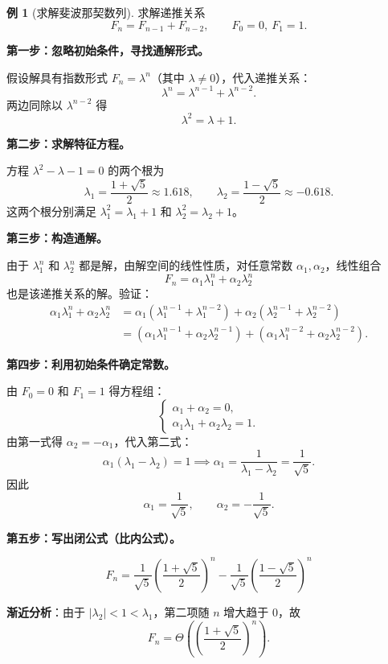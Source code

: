 \documentclass[UTF8,11pt,a4paper]{ctexbook}   %
\theoremstyle{definition}
\newtheorem{example}{例}[section]
\begin{document}
\begin{example}[求解斐波那契数列]
求解递推关系
\[
F_n = F_{n-1} + F_{n-2},\qquad F_0 = 0,\ F_1 = 1.
\]

\textbf{第一步：忽略初始条件，寻找通解形式。}

假设解具有指数形式 $F_n = \lambda^n$（其中 $\lambda \neq 0$），代入递推关系：
\[
\lambda^n = \lambda^{n-1} + \lambda^{n-2}.
\]
两边同除以 $\lambda^{n-2}$ 得
\[
\lambda^2 = \lambda + 1.
\]

\textbf{第二步：求解特征方程。}

方程 $\lambda^2 - \lambda - 1 = 0$ 的两个根为
\[
\lambda_1 = \frac{1+\sqrt{5}}{2} \approx 1.618,\qquad \lambda_2 = \frac{1-\sqrt{5}}{2} \approx -0.618.
\]
这两个根分别满足 $\lambda_1^2 = \lambda_1 + 1$ 和 $\lambda_2^2 = \lambda_2 + 1$。

\textbf{第三步：构造通解。}

由于 $\lambda_1^n$ 和 $\lambda_2^n$ 都是解，由解空间的线性性质，对任意常数 $\alpha_1, \alpha_2$，线性组合
\[
F_n = \alpha_1 \lambda_1^n + \alpha_2 \lambda_2^n
\]
也是该递推关系的解。验证：
\begin{align*}
\alpha_1\lambda_1^n + \alpha_2\lambda_2^n
&= \alpha_1(\lambda_1^{n-1}+\lambda_1^{n-2}) + \alpha_2(\lambda_2^{n-1}+\lambda_2^{n-2})\\
&= (\alpha_1\lambda_1^{n-1}+\alpha_2\lambda_2^{n-1}) + (\alpha_1\lambda_1^{n-2}+\alpha_2\lambda_2^{n-2}).
\end{align*}

\textbf{第四步：利用初始条件确定常数。}

由 $F_0 = 0$ 和 $F_1 = 1$ 得方程组：
\[
\begin{cases}
\alpha_1 + \alpha_2 = 0,\\[0.5em]
\alpha_1\lambda_1 + \alpha_2\lambda_2 = 1.
\end{cases}
\]
由第一式得 $\alpha_2 = -\alpha_1$，代入第二式：
\[
\alpha_1(\lambda_1 - \lambda_2) = 1 \implies \alpha_1 = \frac{1}{\lambda_1-\lambda_2} = \frac{1}{\sqrt{5}}.
\]
因此
\[
\alpha_1 = \frac{1}{\sqrt{5}},\qquad \alpha_2 = -\frac{1}{\sqrt{5}}.
\]

\textbf{第五步：写出闭公式（比内公式）。}

\[
\boxed{F_n = \frac{1}{\sqrt{5}}\left(\frac{1+\sqrt{5}}{2}\right)^n - \frac{1}{\sqrt{5}}\left(\frac{1-\sqrt{5}}{2}\right)^n}
\]

\textbf{渐近分析}：由于 $|\lambda_2| < 1 < \lambda_1$，第二项随 $n$ 增大趋于 $0$，故
\[
F_n = \Theta\left(\left(\frac{1+\sqrt{5}}{2}\right)^n\right).
\]
\end{example}
\end{document}
